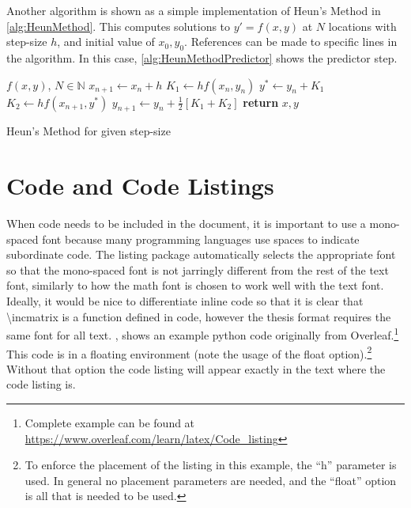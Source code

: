     Another algorithm is shown as a simple implementation of Heun's Method in \cref{alg:HeunMethod}.
    This computes solutions to $y'=f\left(x,y\right)$ at $N$ locations with step-size $h$, and initial value of $x_0, y_0$.
    References can be made to specific lines in the algorithm.
    In this case, \cref{alg:HeunMethodPredictor} shows the predictor step.
    \begin{algorithm}
        \begin{algorithmic}
            \Require $f\left(x,y\right)$, $N\in\mathbb{N}$
                    \State $x_{n+1}\gets x_n+h$
                    \State $K_1\gets hf\left(x_n, y_n\right)$
                    \State $y^*\gets y_n+K_1$ \label{alg:HeunMethodPredictor}
                    \State $K_2\gets hf\left(x_{n+1}, y^*\right)$
                    \State $y_{n+1}\gets y_n+\frac{1}{2}\left[K_1+K_2\right]$
                \EndFor
                \State \textbf{return} $x,y$ 
            \EndProcedure
        \end{algorithmic}
        \caption{Heun's Method for given step-size}
        \label{alg:HeunMethod}
    \end{algorithm}

\section{Code and Code Listings} \label{sec:CodeAndCodeListings}
    When code needs to be included in the document, it is important to use a mono-spaced font because many programming languages use spaces to indicate subordinate code.
    The listing package automatically selects the appropriate font so that the mono-spaced font is not jarringly different from the rest of the text font, similarly to how the math font is chosen to work well with the text font.
    Ideally, it would be nice to differentiate inline code so that it is clear that \textbackslash incmatrix is a function defined in code, however the thesis format requires the same font for all text.
    , shows an example python code originally from Overleaf.\footnote{Complete example can be found at \url{https://www.overleaf.com/learn/latex/Code_listing}}
    This code is in a floating environment (note the usage of the float option).\footnote{To enforce the placement of the listing in this example, the ``h'' parameter is used. In general no placement parameters are needed, and the ``float'' option is all that is needed to be used.}
    Without that option the code listing will appear exactly in the text where the code listing is.

